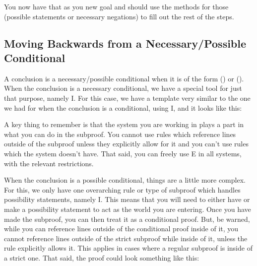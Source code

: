 You now have that as you new goal and should use the methods for those (possible statements or necessary negations) to fill out the rest of the steps. 

\subsection{Moving Backwards from a Necessary/Possible Conditional}

A conclusion is a necessary/possible conditional when it is of the form \ebox (\eif {}) or \ediamond (\eif {}). When the conclusion is a necessary conditional, we have a special tool for just that purpose, namely \ebox \eif I. For this case, we have a template very similar to the one we had for when the conclusion is a conditional, using \eif I, and it looks like this: 
\begin{fitchproof}
\ellipsesline
{}
\open
{}
\ellipsesline
{}
\close
{}
\end{fitchproof}
A key thing to remember is that the system you are working in plays a part in what you can do in the subproof. You cannot use rules which reference lines outside of the subproof unless they explicitly allow for it and you can't use rules which the system doesn't have. That said, you can freely use \ebox E in all systems, with the relevant restrictions. 

When the conclusion is a possible conditional, things are a little more complex. For this, we only have one overarching rule or type of subproof which handles possibility statements, namely \ediamond I. This means that you will need to either have or make a possibility statement to act as the world you are entering. Once you have made the subproof, you can then treat it as a conditional proof. But, be warned, while you can reference lines outside of the conditional proof inside of it, you cannot reference lines outside of the strict subproof while inside of it, unless the rule explicitly allows it. This applies in cases where a regular subproof is inside of a strict one. That said, the proof could look something like this:
\begin{fitchproof}
\ellipsesline
{}			
\open
{}
\open
{}
\ellipsesline
{}
\close
{}
\close
{}
\end{fitchproof}

